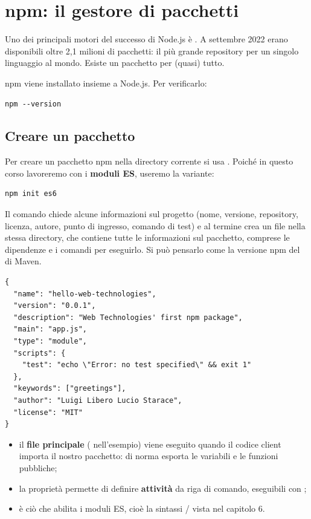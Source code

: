 \section{npm: il gestore di pacchetti}

Uno dei principali motori del successo di Node.js è . A settembre 2022
erano disponibili oltre 2,1 milioni di pacchetti: il più grande repository per
un singolo linguaggio al mondo. Esiste un pacchetto per (quasi) tutto.

npm viene installato insieme a Node.js. Per verificarlo:

\begin{lstlisting}[style=shell]
npm --version
\end{lstlisting}

\subsection{Creare un pacchetto}

Per creare un pacchetto npm nella directory corrente si usa .
Poiché in questo corso lavoreremo con i \textbf{moduli ES}, useremo la variante:

\begin{lstlisting}[style=shell]
npm init es6
\end{lstlisting}

Il comando chiede alcune informazioni sul progetto (nome, versione, repository,
licenza, autore, punto di ingresso, comando di test) e al termine crea un file
 nella stessa directory, che contiene tutte le informazioni
sul pacchetto, comprese le dipendenze e i comandi per eseguirlo. Si può pensarlo
come la versione npm del  di Maven.

\begin{lstlisting}[style=json, name=package.json]
{
  "name": "hello-web-technologies",
  "version": "0.0.1",
  "description": "Web Technologies' first npm package",
  "main": "app.js",
  "type": "module",
  "scripts": {
    "test": "echo \"Error: no test specified\" && exit 1"
  },
  "keywords": ["greetings"],
  "author": "Luigi Libero Lucio Starace",
  "license": "MIT"
}
\end{lstlisting}

\begin{itemize}
  \item il \textbf{file principale} ( nell'esempio) viene eseguito
        quando il codice client importa il nostro pacchetto: di norma esporta le
        variabili e le funzioni pubbliche;
  \item la proprietà  permette di definire \textbf{attività} da
        riga di comando, eseguibili con ;
  \item {} è ciò che abilita i moduli ES, cioè la sintassi
        / vista nel capitolo 6.
\end{itemize}


